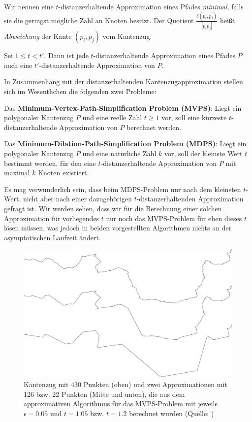 	Wir nennen eine $t$-distanzerhaltende Approximation eines Pfades \emph{minimal}, falls sie die geringst mögliche Zahl an Knoten besitzt.
	Der Quotient $\frac{\delta(p_i, p_j)}{|p_ip_j|}$ heißt \emph{Abweichung} der Kante $(p_i, p_j)$ vom Kantenzug.
	\begin{corollary}
		\label{cor:approximations}
		Sei $1 \leq t < t'$. Dann ist jede $t$-distanzerhaltende Approximation eines Pfades $P$ auch eine $t'$-distanzerhaltende Approximation von $P$.
	\end{corollary}

	In Zusammenhang mit der distanzerhaltenden Kantenzugapproximation stellen sich im Wesentlichen die folgenden zwei Probleme:
	
	\noindent Das \textbf{Minimum-Vertex-Path-Simplification Problem (MVPS)}: Liegt ein polygonaler Kantenzug $P$ und eine reelle Zahl $t \geq 1$ vor, soll eine kürzeste $t$-distanzerhaltende Approximation von $P$ berechnet werden.
	
	\noindent Das \textbf{Minimum-Dilation-Path-Simplification Problem (MDPS)}: Liegt ein polygonaler Kantenzug $P$ und eine natürliche Zahl $k$ vor, soll der kleinste Wert $t$ bestimmt werden, für den eine $t$-distanzerhaltende Approximation von $P$ mit maximal $k$ Knoten existiert.
	
	Es mag verwunderlich sein, dass beim MDPS-Problem nur nach dem kleinsten $t$-Wert, nicht aber nach einer dazugehörigen $t$-distanzerhaltenden Approximation gefragt ist. 
	Wir werden sehen, dass wir für die Berechnung einer solchen Approximation für vorliegendes $t$ nur noch das MVPS-Problem für eben dieses $t$ lösen müssen, was jedoch in beiden vorgestellten Algorithmen nichts an der asymptotischen Laufzeit ändert.

    \begin{figure}
    	\centering
    	\begin{minipage}{.8\linewidth}
    		 \includegraphics[scale=0.15]{approximation_example}
    	\end{minipage}
    	\caption{Kantenzug mit 430 Punkten (oben) und zwei Approximationen mit 126 bzw. 22 Punkten (Mitte und unten), die aus dem approximativen Algorithmus für das MVPS-Problem mit jeweils $\epsilon = 0.05$ und $t = 1.05$ bzw. $t = 1.2$ berechnet wurden (Quelle: \cite{gudmundsson})}
    \end{figure}